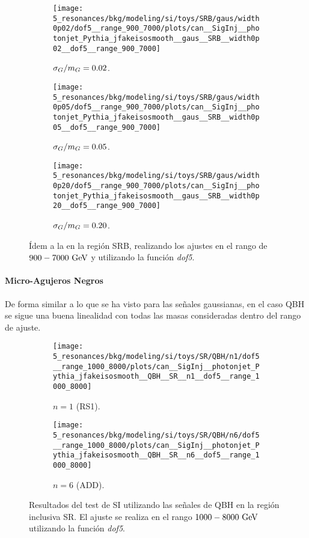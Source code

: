 \begin{figure}[ht!]
    \centering
    \begin{subfigure}[h]{0.32\linewidth}
        \centering
        \texttt{[image: 5\_resonances/bkg/modeling/si/toys/SRB/gaus/width0p02/dof5\_\_range\_900\_7000/plots/can\_\_SigInj\_\_photonjet\_Pythia\_jfakeisosmooth\_\_gaus\_\_SRB\_\_width0p02\_\_dof5\_\_range\_900\_7000]}
        \caption{\(\sigma_G/m_{G} = 0.02\).}
    \end{subfigure}
    \hfill
    \begin{subfigure}[h]{0.32\linewidth}
        \centering
        \texttt{[image: 5\_resonances/bkg/modeling/si/toys/SRB/gaus/width0p05/dof5\_\_range\_900\_7000/plots/can\_\_SigInj\_\_photonjet\_Pythia\_jfakeisosmooth\_\_gaus\_\_SRB\_\_width0p05\_\_dof5\_\_range\_900\_7000]}
        \caption{\(\sigma_G/m_{G} = 0.05\).}
    \end{subfigure}
    \hfill
    \begin{subfigure}[h]{0.32\linewidth}
        \centering
        \texttt{[image: 5\_resonances/bkg/modeling/si/toys/SRB/gaus/width0p20/dof5\_\_range\_900\_7000/plots/can\_\_SigInj\_\_photonjet\_Pythia\_jfakeisosmooth\_\_gaus\_\_SRB\_\_width0p20\_\_dof5\_\_range\_900\_7000]}
        \caption{\(\sigma_G/m_{G} = 0.20\).}
    \end{subfigure}
    \caption{\'Idem a la \Fig{\ref{fig:si_results:siginj_gaus_SR}} en la regi\'on SRB, realizando los ajustes en el rango de \(900-7000~\text{GeV}\) y utilizando la funci\'on \textit{dof5}.}
    \label{fig:si_results:siginj_gaus_SRB}
\end{figure}



\paragraph{Micro-Agujeros Negros}
De forma similar a lo que se ha visto para las señales gaussianas, en el caso \ac{QBH} se sigue una buena linealidad con todas las masas consideradas dentro del rango de ajuste.

\begin{figure}[ht!]
    \centering
    \begin{subfigure}[h]{0.49\linewidth}
        \centering
        \texttt{[image: 5\_resonances/bkg/modeling/si/toys/SR/QBH/n1/dof5\_\_range\_1000\_8000/plots/can\_\_SigInj\_\_photonjet\_Pythia\_jfakeisosmooth\_\_QBH\_\_SR\_\_n1\_\_dof5\_\_range\_1000\_8000]}
        \caption{\(n = 1\) (RS1).}
    \end{subfigure}
    \hfill
    \begin{subfigure}[h]{0.49\linewidth}
        \centering
        \texttt{[image: 5\_resonances/bkg/modeling/si/toys/SR/QBH/n6/dof5\_\_range\_1000\_8000/plots/can\_\_SigInj\_\_photonjet\_Pythia\_jfakeisosmooth\_\_QBH\_\_SR\_\_n6\_\_dof5\_\_range\_1000\_8000]}
        \caption{\(n = 6\) (ADD).}
    \end{subfigure}
    \caption{Resultados del test de \ac{SI} utilizando las se\~nales de \ac{QBH} en la regi\'on inclusiva SR. El ajuste se realiza en el rango \(1000-8000~\text{GeV}\) utilizando la funci\'on \textit{dof5}.}
    \label{fig:si_results:siginj_QBH_SR}
\end{figure}